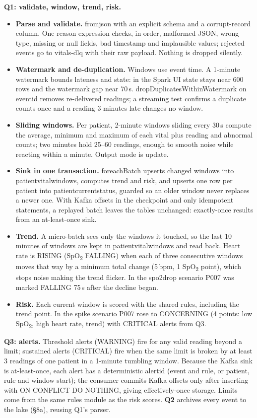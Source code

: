 \documentclass[11pt,a4paper]{article}
\newcommand{\ubreak}{\textunderscore\allowbreak}
\newcommand{\code}[1]{{\small\ttfamily\let\_\ubreak #1}}
\newcommand{\spo}{SpO\textsubscript{2}}
\begin{document}
\textbf{Q1: validate, window, trend, risk.}
\begin{itemize}
\item \textbf{Parse and validate.} \code{from\_json} with an explicit schema and a corrupt-record column. One
  \code{reason} expression checks, in order, malformed JSON, wrong type, missing or null fields, bad timestamp and
  implausible values; rejected events go to \code{vitals-dlq} with their raw payload. Nothing is dropped silently.
\item \textbf{Watermark and de-duplication.} Windows use event time. A 1-minute watermark bounds lateness and state:
  in the Spark UI state stays near 600 rows and the watermark gap near 70\,s.
  \code{dropDuplicatesWithinWatermark} on \code{event\_id} removes re-delivered readings; a streaming test confirms
  a duplicate counts once and a reading 3 minutes late changes no window.
\item \textbf{Sliding windows.} Per patient, 2-minute windows sliding every 30\,s compute the average, minimum and
  maximum of each vital plus reading and abnormal counts; two minutes hold 25--60 readings, enough to smooth noise
  while reacting within a minute. Output mode is update.
\item \textbf{Sink in one transaction.} \code{foreachBatch} upserts changed windows into
  \code{patient\_vital\_windows}, computes trend and risk, and upserts one row per patient into
  \code{patient\_current\_status}, guarded so an older window never replaces a newer one. With Kafka offsets in the
  checkpoint and only idempotent statements, a replayed batch leaves the tables unchanged: exactly-once results from
  an at-least-once sink.
\item \textbf{Trend.} A micro-batch sees only the windows it touched, so the last 10 minutes of windows are kept in
  \code{patient\_vital\_windows} and read back. Heart rate is RISING (\spo{} FALLING) when each of three consecutive
  windows moves that way by a minimum total change (5\,bpm, 1 \spo{} point), which stops noise making the trend
  flicker. In the \code{spo2\_drop} scenario P007 was marked FALLING 75\,s after the decline began.
\item \textbf{Risk.} Each current window is scored with the shared rules, including the trend point. In the
  \code{spike} scenario P007 rose to CONCERNING (4 points: low \spo, high heart rate, trend) with CRITICAL alerts
  from Q3.
\end{itemize}

\textbf{Q3: alerts.} Threshold alerts (WARNING) fire for any valid reading beyond a limit; sustained alerts
(CRITICAL) fire when the same limit is broken by at least 3 readings of one patient in a 1-minute tumbling window.
Because the Kafka sink is at-least-once, each alert has a deterministic \code{alert\_id} (event and rule, or
patient, rule and window start); the consumer commits Kafka offsets only after inserting with
\code{ON CONFLICT DO NOTHING}, giving effectively-once storage. Limits come from the same rules module as the risk
scores. \textbf{Q2} archives every event to the lake (\S8a), reusing Q1's parser.
\end{document}

